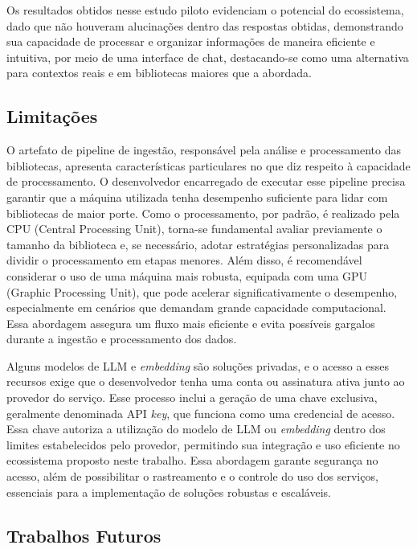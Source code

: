 \documentclass[a4paper, 12pt]{article}
\begin{document}
    Os resultados obtidos nesse estudo piloto evidenciam o potencial do ecossistema, dado que não houveram alucinações dentro das respostas obtidas, demonstrando sua capacidade de processar e organizar informações de maneira eficiente e intuitiva, por meio de uma interface de chat, destacando-se como uma alternativa para contextos reais e em bibliotecas maiores que a abordada.

    \subsection{Limitações}

    O artefato de pipeline de ingestão, responsável pela análise e processamento das bibliotecas, apresenta características particulares no que diz respeito à capacidade de processamento. O desenvolvedor encarregado de executar esse pipeline precisa garantir que a máquina utilizada tenha desempenho suficiente para lidar com bibliotecas de maior porte. Como o processamento, por padrão, é realizado pela CPU (Central Processing Unit), torna-se fundamental avaliar previamente o tamanho da biblioteca e, se necessário, adotar estratégias personalizadas para dividir o processamento em etapas menores. Além disso, é recomendável considerar o uso de uma máquina mais robusta, equipada com uma GPU (Graphic Processing Unit), que pode acelerar significativamente o desempenho, especialmente em cenários que demandam grande capacidade computacional. Essa abordagem assegura um fluxo mais eficiente e evita possíveis gargalos durante a ingestão e processamento dos dados.

    Alguns modelos de LLM e \textit{embedding} são soluções privadas, e o acesso a esses recursos exige que o desenvolvedor tenha uma conta ou assinatura ativa junto ao provedor do serviço. Esse processo inclui a geração de uma chave exclusiva, geralmente denominada API \textit{key}, que funciona como uma credencial de acesso. Essa chave autoriza a utilização do modelo de LLM ou \textit{embedding} dentro dos limites estabelecidos pelo provedor, permitindo sua integração e uso eficiente no ecossistema proposto neste trabalho. Essa abordagem garante segurança no acesso, além de possibilitar o rastreamento e o controle do uso dos serviços, essenciais para a implementação de soluções robustas e escaláveis.

    \subsection{Trabalhos Futuros}
    
\end{document}
